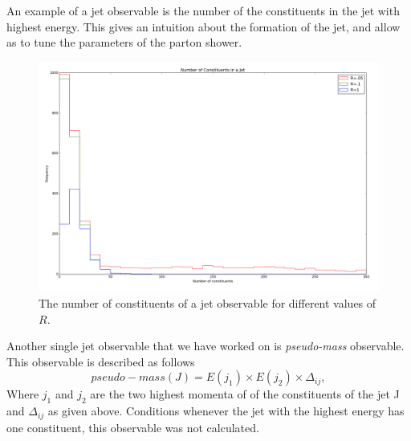 An example of a jet observable is the number of the constituents in the jet with highest energy.  This gives an intuition about the formation of the jet, and allow as to tune the parameters of the parton shower.
\begin{figure}[hbtp]
\centering
\includegraphics[scale=.3]{images/figure_12.png}
\caption{The number of constituents of a jet observable for different  values of $R$.  
}\label{nofcon}
\end{figure}


Another single jet observable that we have worked on is \textit{pseudo-mass} observable. This observable is described as follows \begin{equation}
pseudo-mass(J) = E(j_1) \times E(j_2) \times \Delta_{ij} ,
\end{equation}   Where $j_1$ and $j_2$ are the two highest  momenta of of the constituents of the jet J and $\Delta_{ij}$ as given above.
Conditions whenever
the jet with the highest energy has one constituent, this observable was not calculated.


